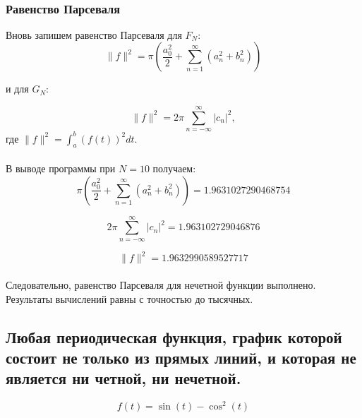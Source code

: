 \documentclass[a5paper, 10pt]{article}
\theoremstyle{definition}
\theoremstyle{plain}
\theoremstyle{remark}
\begin{document}
\newpage
\,
\newpage
\subsubsection{Равенство Парсеваля}

Вновь запишем равенство Парсеваля для $F_N$:
\begin{equation}
\| f \|^2 = \pi \left( \frac{a_0^2}{2} + \sum \limits_{n=1}^{\infty} \left( a_n^2 + b_n^2 \right) \right)
\end{equation}

и для $G_N$:

\begin{equation}
\| f \|^2 = 2 \pi \sum \limits_{n = -\infty}^{\infty} |c_n |^2,
\end{equation}
где $\| f \|^2 = \int_a^b (f(t))^2 dt $.
\\
\\
 В выводе программы при $N=10$ получаем:
\begin{equation*}
 \pi \left( \frac{a_0^2}{2} + \sum \limits_{n=1}^{\infty} \left( a_n^2 + b_n^2 \right) \right) = 1.9631027290468754 
\end{equation*}

\begin{equation*}
2 \pi \sum \limits_{n = -\infty}^{\infty} |c_n |^2 = 1.963102729046876
\end{equation*}

\begin{equation*}
\| f \|^2  = 1.9632990589527717
\end{equation*}
\\
Следовательно, равенство Парсеваля для нечетной функции выполнено. Результаты вычислений равны с точностью до тысячных.




\newpage
\subsection{Любая периодическая функция, график которой состоит не только из прямых линий, и которая не является ни четной, ни нечетной.}
\begin{equation}
f(t) = \sin(t) - \cos^2(t) 
\end{equation}
\end{document}
